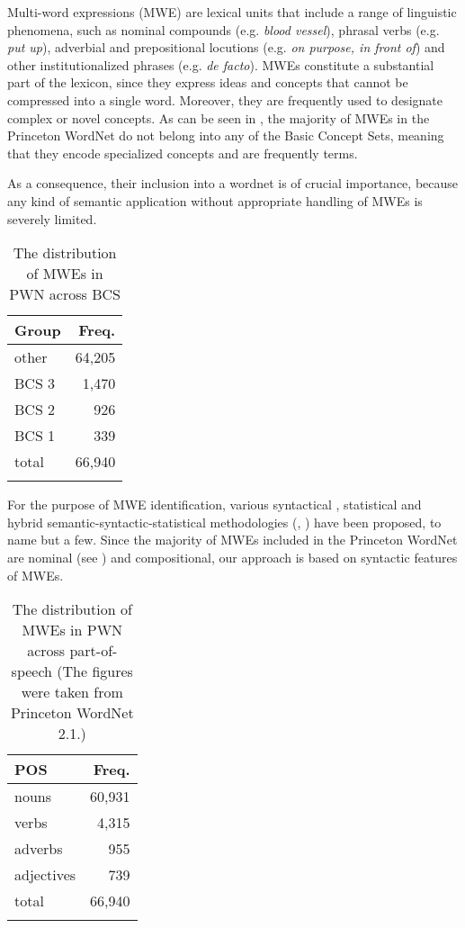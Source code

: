 \documentclass[output=paper]{LSP/langsci}
\begin{document}
Multi-word expressions (MWE) are lexical units that include a range of linguistic phenomena, such as nominal compounds (e.g. \textit{blood vessel}), phrasal verbs (e.g. \textit{put up}), adverbial and prepositional locutions (e.g. \textit{on purpose, in front of}) and other institutionalized phrases (e.g. \textit{de facto}). MWEs constitute a substantial part of the lexicon, since they express ideas and concepts that cannot be compressed into a single word. Moreover, they are frequently used to designate complex or novel concepts. As can be seen in , the majority of MWEs in the Princeton WordNet do not belong into any of the Basic Concept Sets, meaning that they encode specialized concepts and are frequently terms.

As a consequence, their inclusion into a wordnet is of crucial importance, because any kind of semantic application without appropriate handling of MWEs is severely limited.

\begin{table}
\begin{tabular}{lr}
\lsptoprule
{\bfseries Group } & \bfseries Freq. \\
\midrule
other & 64,205 \\
BCS 3 & 1,470 \\
BCS 2 & 926 \\
BCS 1 & 339 \\
total & 66,940 \\
\lspbottomrule
\end{tabular}
\caption{The distribution of MWEs in PWN across BCS}
\label{tab:vintar:1}
\end{table}


\newpage
For the purpose of MWE identification, various syntactical \citep{Bourigault1993}, statistical \citep{Tomokiyo2003} and hybrid semantic-syntactic-statistical methodologies (\citealt{PiaoEtAl2003}, \citealt{Dias2004}) have been proposed, to name but a few. Since the majority of MWEs included in the Princeton WordNet are nominal (see ) and compositional, our approach is based on syntactic features of MWEs. 

\begin{table}
\begin{tabular}{lr}
\lsptoprule
{\bfseries POS } & \bfseries Freq. \\
\midrule
nouns & 60,931 \\
verbs & 4,315 \\
adverbs & 955 \\
adjectives & 739 \\
total & 66,940 \\
\lspbottomrule
\end{tabular}
\caption{The distribution of MWEs in PWN across part-of-speech (The figures were taken from Princeton WordNet 2.1.)}
\label{tab:vintar:2}
\end{table}
\end{document}
